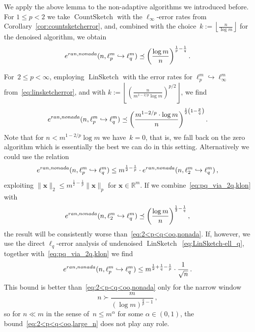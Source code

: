 \documentclass[12pt]{article}
\theoremstyle{plain}
\theoremstyle{definition}
\newcommand{\ran}{\textup{ran}}
\newcommand{\nonada}{\textup{nonada}}
\newcommand{\embed}{\hookrightarrow}
\renewcommand{\vec}{\boldsymbol}
\newcommand{\R}{{\mathbb R}}
\DeclareMathOperator{\linsketch}{LinSketch}
\DeclareMathOperator{\countsketch}{CountSketch}
\begin{document}
We apply the above lemma to the non-adaptive algorithms we introduced before.
For $1 \leq p < 2$ we take $\countsketch$ with the $\ell_\infty$-error rates from Corollary~\ref{cor:countsketcherror},
and, combined with the choice~$k := \left\lfloor \frac{n}{\log m} \right\rfloor$
for the denoised algorithm, we obtain
\begin{equation} \label{eq:nonada,p<=2}
    e^{\ran,\nonada}(n,\ell_p^m \embed \ell_q^m) 
        \preceq \left(\frac{\log m}{n}\right)^{\frac{1}{p} - \frac{1}{q}} .
\end{equation}

For~$2 \leq p < \infty$, employing $\linsketch$ with the error rates for $\ell_p^m \embed \ell_\infty^m$ from~\eqref{eq:linsketcherror}, 
and with $k := \left\lfloor \left(\frac{n}{m^{1 - 2/p} \log m}\right)^{p/2}\right\rfloor$, 
we find
\begin{equation}
    e^{\ran,\nonada}(n,\ell_p^m \embed \ell_q^m)
        \preceq
            \left( \frac{m^{1-2/p} \cdot \log m}{n}\right)^{\frac{1}{2}\left(1 - \frac{p}{q}\right)}.
        \label{eq:2<p<q<oo,nonada}
\end{equation}
Note that for $n < m^{1-2/p} \log m$ we have~$k=0$, that is, we fall back on the zero algorithm
which is essentially the best we can do in this setting.
Alternatively we could use the relation
\begin{equation} \label{eq:pq_via_2q,klon}
    e^{\ran,\nonada}(n,\ell_p^m \embed \ell_q^m)
        \leq m^{\frac{1}{2}-\frac{1}{p}} \cdot e^{\ran,\nonada}(n,\ell_2^m \embed \ell_q^m) \,,
\end{equation}
exploiting $\|\vec{x}\|_2 \leq m^{\frac{1}{2} - \frac{1}{p}} \|\vec{x}\|_p$ for $\vec{x} \in \R^m$.
If we combine~\eqref{eq:pq_via_2q,klon} with
\begin{equation*}
    e^{\ran,\nonada}(n,\ell_2^m \embed \ell_q^m) \preceq \left(\frac{\log m}{n}\right)^{\frac{1}{2} - \frac{1}{q}},
\end{equation*}
the result will be consistently worse than~\eqref{eq:2<p<q<oo,nonada}.
If, however, we use the direct $\ell_q$-error analysis of undenoised $\linsketch$~\eqref{eq:LinSketch-ell_q},
together with~\eqref{eq:pq_via_2q,klon} we find
\begin{equation} \label{eq:2<p<q<oo,large_n}
    e^{\ran,\nonada}(n,\ell_p^m \embed \ell_q^m)
        \leq m^{\frac{1}{2} + \frac{1}{q} - \frac{1}{p}} \cdot \frac{1}{\sqrt{n}}\,.
\end{equation}
This bound is better than~\eqref{eq:2<p<q<oo,nonada} only for the narrow window
\begin{equation*}
    n \succ \frac{m}{(\log m)^{\frac{q}{p} - 1}} \,,
\end{equation*}
so for $n\ll m$ in the sense of~$n \leq m^\alpha$ for some $\alpha \in (0,1)$,
the bound~\eqref{eq:2<p<q<oo,large_n} does not play any role.
\end{document}
